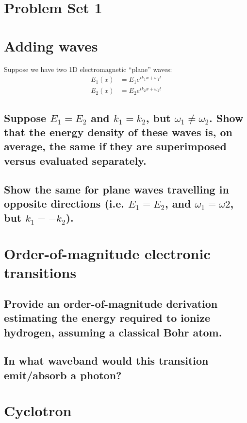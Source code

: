 \documentclass[11pt]{article}
\begin{document}
\pagestyle{empty}
\parindent=0pt

\section*{\centering Problem Set 1}

\section{Adding waves}
Suppose we have two 1D electromagnetic ``plane'' waves:
\begin{eqnarray}
E_1(x) &= E_1e^{ik_1x+\omega_1 t}\\
E_2(x) &= E_2e^{ik_2x+\omega_2 t}
\end{eqnarray}
\subsection{Suppose $E_1=E_2$ and $k_1=k_2$, but $\omega_1\ne\omega_2$.  Show that the energy density
of these waves is, on average, the same if they are superimposed versus evaluated separately.}
\vspace{0.25in}
\subsection{Show the same for plane waves travelling in opposite directions (i.e.
$E_1=E_2$, and $\omega_1=\omega2$, but $k_1=-k_2$).}

\section{Order-of-magnitude electronic transitions}

\subsection{Provide an order-of-magnitude derivation estimating the energy required to ionize hydrogen,
assuming a classical Bohr atom.}
\vspace{0.25in}
\subsection{In what waveband would this transition emit/absorb a photon?}
\vspace{0.25in}

\section{Cyclotron}
\end{document}
